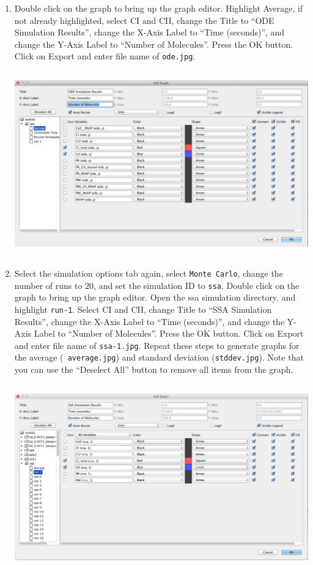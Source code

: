 \documentclass[titlepage,11pt]{article}
\begin{document}
\begin{enumerate}
\item Double click on the graph to bring up the graph editor.
  Highlight Average, if not already highlighted, select CI and CII, 
change the Title to ``ODE Simulation Results'', 
change the X-Axis Label to ``Time
(seconds)'', and change the Y-Axis Label to ``Number of Molecules''.  
Press the OK button.  Click on Export and enter file name of {\tt ode.jpg}.

\includegraphics[height=80mm]{screenshots/odeResults}

\item Select the simulation options tab again, select {\tt Monte
    Carlo}, change the number of runs to 20, and set the simulation ID
  to {\tt ssa}.  Double click on the graph to bring up the graph editor.
Open the ssa simulation directory, and highlight {\tt run-1}.
Select CI and CII, change Title to ``SSA Simulation Results'', 
change the X-Axis Label to ``Time (seconds)'', and change the Y-Axis
Label to ``Number of Molecules''.  Press the OK button.  Click on
Export and enter file name of {\tt ssa-1.jpg}.
Repeat these steps to generate graphs for the average ({\tt
  average.jpg}) and standard deviation ({\tt stddev.jpg}).
Note that you can use the ``Deselect All'' button to
remove all items from the graph.

\includegraphics[height=80mm]{screenshots/ssaResults}


\end{enumerate}
\end{document}
